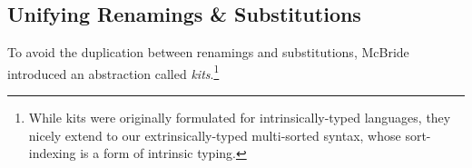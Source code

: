 \documentclass[a4paper, UKenglish, cleveref, autoref, thm-restate]{lipics-v2021}
\newcommand*\ACode[1]{\AgdaFontStyle{\textcolor{mygray}{#1}}}
\newcommand*\ACon[1]{\AgdaInductiveConstructor{#1}}
\begin{document}



  \subsection{Unifying Renamings \& Substitutions}
  \label{sec:maps:kits}
  To avoid the duplication between renamings and substitutions,
  McBride\cite{DBLP:journals/jar/BentonHKM12, unpublished:mcbride2005kits}
  introduced an abstraction called \emph{kits}.\footnote{
    While kits were originally formulated for intrinsically-typed languages,
    they nicely extend to our extrinsically-typed multi-sorted syntax, whose
    sort-indexing is a form of intrinsic typing.
  }
\end{document}

